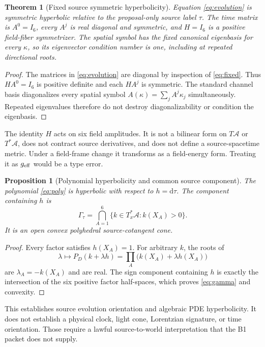 \documentclass[11pt]{article}
\newcommand{\A}{\mathcal A}
\newcommand{\dd}{\mathrm d}
\newcommand{\Gam}{\Gamma_{\tau}}
\newtheorem{proposition}{Proposition}
\newtheorem{theorem}{Theorem}
\begin{document}
\begin{theorem}[Fixed source symmetric hyperbolicity]
Equation \eqref{eq:evolution} is symmetric hyperbolic relative to the
proposal-only source label $\tau$.  The time matrix is $A^0=I_6$, every
$A^j$ is real diagonal and symmetric, and $H=I_6$ is a positive field-fiber
symmetrizer.  The spatial symbol has the fixed canonical eigenbasis for every
$\kappa$, so its eigenvector condition number is one, including at repeated
directional roots.
\end{theorem}

\begin{proof}
The matrices in \eqref{eq:evolution} are diagonal by inspection of
\eqref{eq:fixed}.  Thus $H A^0=I_6$ is positive definite and each $H A^j$
is symmetric.  The standard channel basis diagonalizes every spatial symbol
$A(\kappa)=\sum_j A^j\kappa_j$ simultaneously.  Repeated eigenvalues therefore
do not destroy diagonalizability or condition the eigenbasis.
\end{proof}

The identity $H$ acts on six field amplitudes.  It is not a bilinear form on
$T\A$ or $T^*\A$, does not contract source derivatives, and does not define a
source-spacetime metric.  Under a field-frame change it transforms as a
field-energy form.  Treating it as $g_{\rm eff}$ would be a type error.

\begin{proposition}[Polynomial hyperbolicity and common source component]
The polynomial \eqref{eq:poly} is hyperbolic with respect to
$h=\dd\tau$.  The component containing $h$ is
\begin{equation}
 \Gam=\bigcap_{A=1}^{6}\{k\in T_x^*\A:k(X_A)>0\}.
 \label{eq:gamma}
\end{equation}
It is an open convex polyhedral source-cotangent cone.
\end{proposition}

\begin{proof}
Every factor satisfies $h(X_A)=1$.  For arbitrary $k$, the roots of
\begin{equation}
 \lambda\longmapsto P_D(k+\lambda h)
 =\prod_A\bigl(k(X_A)+\lambda h(X_A)\bigr)
\end{equation}
are $\lambda_A=-k(X_A)$ and are real.  The sign component containing $h$ is
exactly the intersection of the six positive factor half-spaces, which proves
\eqref{eq:gamma} and convexity.
\end{proof}

This establishes source evolution orientation and algebraic PDE hyperbolicity.
It does not establish a physical clock, light cone, Lorentzian signature, or
time orientation.  Those require a lawful source-to-world interpretation that
the B1 packet does not supply.
\end{document}
